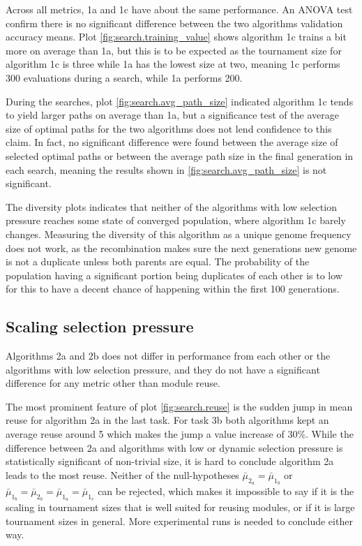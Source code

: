 Across all metrics, 1a and 1c have about the same performance. An ANOVA test confirm there is no significant difference between the two algorithms validation accuracy means. Plot \ref{fig:search.training_value} shows algorithm 1c trains a bit more on average than 1a, but this is to be expected as the tournament size for algorithm 1c is three while 1a has the lowest size at two, meaning 1c performs 300 evaluations during a search, while 1a performs 200.

During the searches, plot \ref{fig:search.avg_path_size} indicated algorithm 1c tends to yield larger paths on average than 1a, but a significance test of the average size of optimal paths for the two algorithms does not lend confidence to this claim. In fact, no significant difference were found between the average size of selected optimal paths or between the average path size in the final generation in each search, meaning the results shown in \ref{fig:search.avg_path_size} is not significant.

The diversity plots indicates that neither of the algorithms with low selection pressure reaches some state of converged population, where algorithm 1c barely changes. Measuring the diversity of this algorithm as a unique genome frequency does not work, as the recombination makes sure the next generations new genome is not a duplicate unless both parents are equal. The probability of the population having a significant portion being duplicates of each other is to low for this to have a decent chance of happening within the first 100 generations. 

\subsection{Scaling selection pressure}
Algorithms 2a and 2b does not differ in performance from each other or the algorithms with low selection pressure, and they do not have a significant difference for any metric other than module reuse. 

The most prominent feature of plot \ref{fig:search.reuse} is the sudden jump in mean reuse for algorithm 2a in the last task. For task 3b both algorithms kept an average reuse around 5 which makes the jump a value increase of 30\%. While the difference between 2a and algorithms with low or dynamic selection pressure is statistically significant of non-trivial size, it is hard to conclude algorithm 2a leads to the most reuse. Neither of the null-hypotheses \(\bar{\mu}_{2_{a}}=\bar{\mu}_{1_{b}}\) or \(\bar{\mu}_{1_{b}}=\bar{\mu}_{2_{b}}=\bar{\mu}_{1_{a}}=\bar{\mu}_{1_{c}}\) can be rejected, which makes it impossible to say if it is the scaling in tournament sizes that is well suited for reusing modules, or if it is large tournament sizes in general. More experimental runs is needed to conclude either way.  


